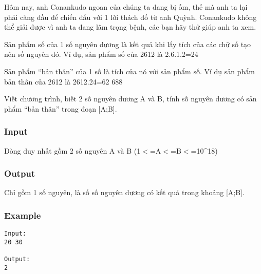 



   Hôm nay, anh Conankudo ngoan của chúng ta đang bị ốm, thế mà anh ta lại phải căng đầu để chiến đấu với 1 lời thách đố từ anh Quỳnh. Conankudo không thể giải được vì anh ta đang lâm trọng bệnh, các bạn hãy thử giúp anh ta xem.  

   Sản phẩm số của 1 số nguyên dương là kết quả khi lấy tích của các chữ số tạo nên số nguyên đó. Ví dụ, sản phẩm số của 2612 là 2.6.1.2=24  

   Sản phẩm “bản thân” của 1 số      là tích của nó với sản phẩm số. Ví dụ sản phẩm bản thân của 2612 là 2612.24=62 688  

   Viết chương trình, biết 2 số nguyên dương A và B, tính số nguyên dương có sản phẩm “bản thân” trong đoạn [A;B].  

\subsubsection{   Input  }

   Dòng duy nhất gồm 2 số nguyên A và B (1$<$=A$<$=B$<$=10\textasciicircum18)  

\subsubsection{   Output  }

   Chỉ gồm 1 số nguyên, là số số nguyên dương có kết quả trong khoảng [A;B].  

\subsubsection{   Example  }
\begin{verbatim}
Input:
20 30

Output:
2
\end{verbatim}